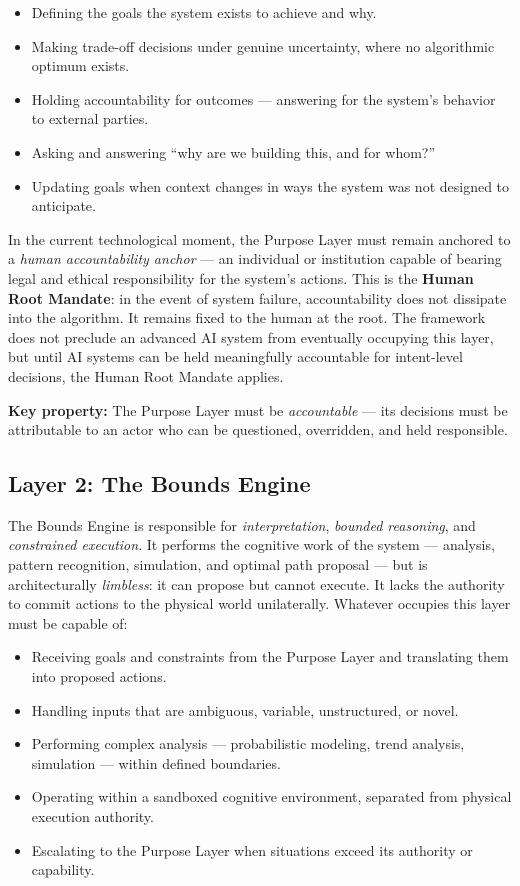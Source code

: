 \documentclass[12pt]{article}
\begin{document}
\begin{itemize}[noitemsep]
    \item Defining the goals the system exists to achieve and why.
    \item Making trade-off decisions under genuine uncertainty, where no algorithmic optimum exists.
    \item Holding accountability for outcomes --- answering for the system's behavior to external parties.
    \item Asking and answering ``why are we building this, and for whom?''
    \item Updating goals when context changes in ways the system was not designed to anticipate.
\end{itemize}

In the current technological moment, the Purpose Layer must remain anchored to a \textit{human accountability anchor} --- an individual or institution capable of bearing legal and ethical responsibility for the system's actions. This is the \textbf{Human Root Mandate}: in the event of system failure, accountability does not dissipate into the algorithm. It remains fixed to the human at the root. The framework does not preclude an advanced AI system from eventually occupying this layer, but until AI systems can be held meaningfully accountable for intent-level decisions, the Human Root Mandate applies.

\textbf{Key property:} The Purpose Layer must be \textit{accountable} --- its decisions must be attributable to an actor who can be questioned, overridden, and held responsible.

\subsection{Layer 2: The Bounds Engine}

The Bounds Engine is responsible for \textit{interpretation}, \textit{bounded reasoning}, and \textit{constrained execution}. It performs the cognitive work of the system --- analysis, pattern recognition, simulation, and optimal path proposal --- but is architecturally \textit{limbless}: it can propose but cannot execute. It lacks the authority to commit actions to the physical world unilaterally. Whatever occupies this layer must be capable of:

\begin{itemize}[noitemsep]
    \item Receiving goals and constraints from the Purpose Layer and translating them into proposed actions.
    \item Handling inputs that are ambiguous, variable, unstructured, or novel.
    \item Performing complex analysis --- probabilistic modeling, trend analysis, simulation --- within defined boundaries.
    \item Operating within a sandboxed cognitive environment, separated from physical execution authority.
    \item Escalating to the Purpose Layer when situations exceed its authority or capability.
\end{itemize}
\end{document}
